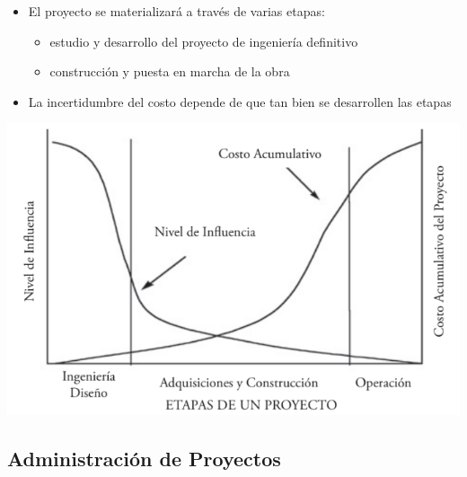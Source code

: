 \documentclass{article} %
\begin{document}
\begin{minipage}{0.45\textwidth}
    \begin{itemize}
        \item El proyecto se materializará a través de varias etapas:
        \begin{itemize}
            \item estudio y desarrollo del proyecto de ingeniería definitivo
            \item construcción y puesta en marcha de la obra
        \end{itemize}
    \item La incertidumbre del costo depende de que tan bien se desarrollen las etapas
    \end{itemize}
\end{minipage}
\hfill
\begin{minipage}{0.5\textwidth}
    \centering
    \includegraphics[width=1.2\textwidth]{etapas_proyecto.png}
\end{minipage}

\subsection{Administración de Proyectos}
\end{document}
